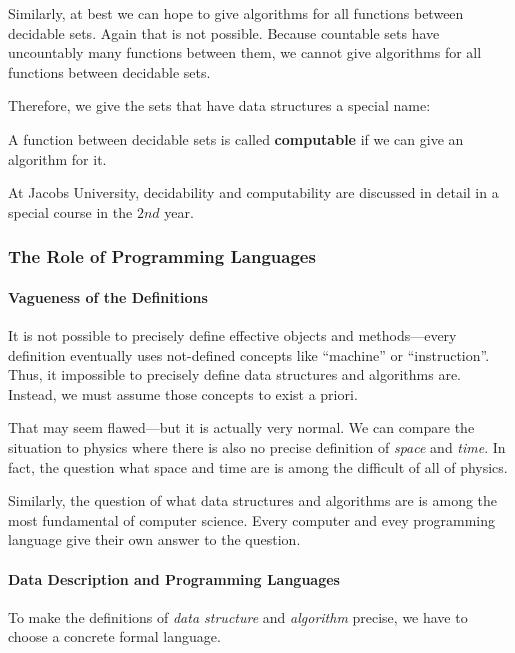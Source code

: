 Similarly, at best we can hope to give algorithms for all functions between decidable sets.
Again that is not possible.
Because countable sets have uncountably many functions between them, we cannot give algorithms for all functions between decidable sets.

Therefore, we give the sets that have data structures a special name:

\begin{definition}[Computable]
A function between decidable sets is called \textbf{computable} if we can give an algorithm for it.
\end{definition}

At Jacobs University, decidability and computability are discussed in detail in a special course in the $2nd$ year.

\subsubsection{The Role of Programming Languages}

\paragraph{Vagueness of the Definitions}
It is not possible to precisely define effective objects and methods---every definition eventually uses not-defined concepts like ``machine'' or ``instruction''.
Thus, it impossible to precisely define data structures and algorithms are.
Instead, we must assume those concepts to exist a priori.

That may seem flawed---but it is actually very normal.
We can compare the situation to physics where there is also no precise definition of \emph{space} and \emph{time}.
In fact, the question what space and time are is among the difficult of all of physics.\footnotemark
{}

Similarly, the question of what data structures and algorithms are is among the most fundamental of computer science.
Every computer and evey programming language give their own answer to the question.

\paragraph{Data Description and Programming Languages}
To make the definitions of \emph{data structure} and \emph{algorithm} precise, we have to choose a concrete formal language.

